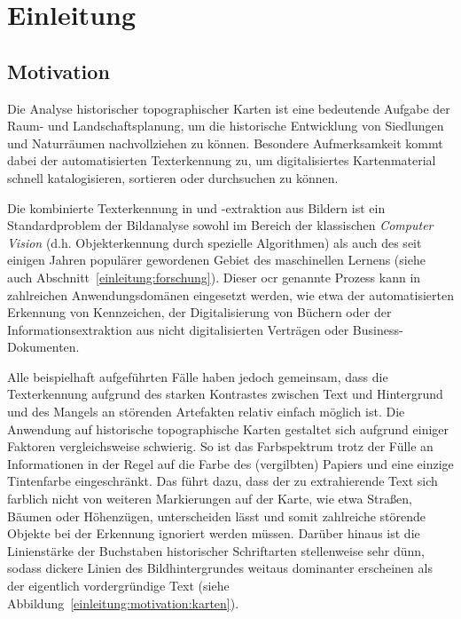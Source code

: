 \section{Einleitung}
\label{einleitung}

\subsection{Motivation}
\label{einleitung:motivation}

Die Analyse historischer topographischer Karten ist eine bedeutende Aufgabe der Raum- und Landschaftsplanung, um die
historische Entwicklung von Siedlungen und Naturräumen nachvollziehen zu können. Besondere Aufmerksamkeit kommt dabei
der automatisierten Texterkennung zu, um digitalisiertes Kartenmaterial schnell katalogisieren, sortieren oder
durchsuchen zu können.

Die kombinierte Texterkennung in und -extraktion aus Bildern ist ein Standardproblem der Bildanalyse sowohl im Bereich
der klassischen \textit{Computer Vision} (d.h. Objekterkennung durch spezielle Algorithmen) als auch des seit einigen
Jahren populärer gewordenen Gebiet des maschinellen Lernens (siehe auch Abschnitt~\ref{einleitung:forschung}). Dieser
\gls{ocr} genannte Prozess kann in zahlreichen Anwendungsdomänen eingesetzt werden, wie etwa der automatisierten
Erkennung von Kennzeichen, der Digitalisierung von Büchern oder der Informationsextraktion aus nicht digitalisierten
Verträgen oder Business-Dokumenten.

Alle beispielhaft aufgeführten Fälle haben jedoch gemeinsam, dass die Texterkennung aufgrund des starken Kontrastes
zwischen Text und Hintergrund und des Mangels an störenden Artefakten relativ einfach möglich ist. Die Anwendung auf
historische topographische Karten gestaltet sich aufgrund einiger Faktoren vergleichsweise schwierig. So ist das
Farbspektrum trotz der Fülle an Informationen in der Regel auf die Farbe des (vergilbten) Papiers und eine einzige
Tintenfarbe eingeschränkt. Das führt dazu, dass der zu extrahierende Text sich farblich nicht von weiteren Markierungen
auf der Karte, wie etwa Straßen, Bäumen oder Höhenzügen, unterscheiden lässt und somit zahlreiche störende Objekte
bei der Erkennung ignoriert werden müssen. Darüber hinaus ist die Linienstärke der Buchstaben historischer Schriftarten
stellenweise sehr dünn, sodass dickere Linien des Bildhintergrundes weitaus dominanter erscheinen als der eigentlich
vordergründige Text (siehe Abbildung~\ref{einleitung:motivation:karten}).

